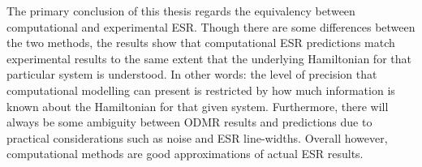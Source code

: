 \documentclass[oneside, astronomy, noacknowlegments]{BYUPhys}
\begin{document}
The primary conclusion of this thesis regards the equivalency between computational and experimental ESR. Though there are some differences between the two methods, the results show that computational ESR predictions match experimental results to the same extent that the underlying Hamiltonian for that particular system is understood. In other words: the level of precision that computational modelling can present is restricted by how much information is known about the Hamiltonian for that given system. Furthermore, there will always be some ambiguity between ODMR results and predictions due to practical considerations such as noise and ESR line-widths. Overall however, computational methods are good approximations of actual ESR results.







\printindex
\end{document}
